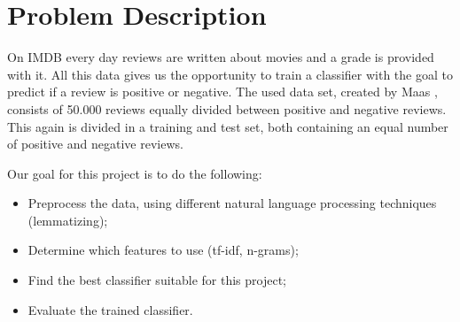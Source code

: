 \section{Problem Description}

On IMDB every day reviews are written about movies and a grade is provided with it.
All this data gives us the opportunity to train a classifier with the goal to predict if a review is positive or negative.
The used data set, created by Maas \etal \cite{Maas:2011}, consists of 50.000 reviews equally divided between positive and negative reviews. 
This again is divided in a training and test set, both containing an equal number of positive and negative reviews.

Our goal for this project is to do the following:
\begin{itemize}
\item Preprocess the data, using different natural language processing techniques (\eg lemmatizing);
\item Determine which features to use (\eg tf-idf, n-grams);
\item Find the best classifier suitable for this project;
\item Evaluate the trained classifier.
\end{itemize}